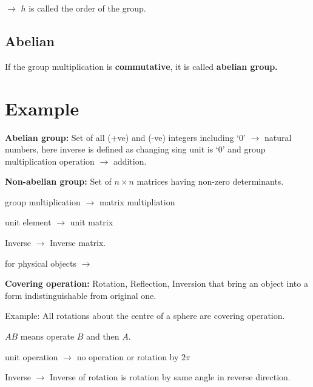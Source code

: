 $\to$ $h$ is called the order of the group.

\subsection*{Abelian}

If the group multiplication is {\bf commutative}, it is called {\bf abelian group.}

\section*{Example}

\noindent
{\bf Abelian group:} Set of all (+ve) and (-ve) integers including `0' $\to$ natural numbers, here inverse is defined as changing sing unit is `0' and group multiplication operation $\to$ addition.

\noindent
{\bf Non-abelian group:} Set of $n\times n$ matrices having non-zero determinants.

group multiplication $\to$ matrix multipliation

unit element $\to$ unit matrix

Inverse $\to$ Inverse matrix.


\noindent
for physical objects $\to$

\noindent
{\bf Covering operation:} Rotation, Reflection, Inversion that bring an object into a form indistinguishable from original one.

\noindent
Example: All rotations about the centre of a sphere are covering operation.

$AB$ means operate $B$ and then $A$.

unit operation $\to$ no operation or rotation by $2\pi$

Inverse $\to$ Inverse of rotation is rotation by same angle in reverse direction.

